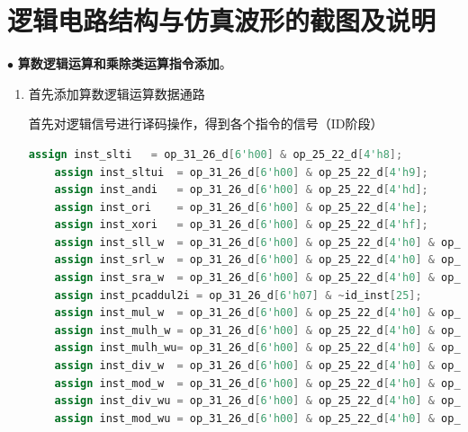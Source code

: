 \documentclass[11pt]{article}
\begin{document}


\section{逻辑电路结构与仿真波形的截图及说明}
\noindent
$\bullet$
\textbf{算数逻辑运算和乘除类运算指令添加}。
\begin{enumerate}
  \item 首先添加算数逻辑运算数据通路
  
  首先对逻辑信号进行译码操作，得到各个指令的信号（ID阶段）

  \begin{lstlisting}[language=verilog]
    assign inst_slti   = op_31_26_d[6'h00] & op_25_22_d[4'h8];
    assign inst_sltui  = op_31_26_d[6'h00] & op_25_22_d[4'h9];
    assign inst_andi   = op_31_26_d[6'h00] & op_25_22_d[4'hd];
    assign inst_ori    = op_31_26_d[6'h00] & op_25_22_d[4'he];
    assign inst_xori   = op_31_26_d[6'h00] & op_25_22_d[4'hf];
    assign inst_sll_w  = op_31_26_d[6'h00] & op_25_22_d[4'h0] & op_21_20_d[2'h1] & op_19_15_d[5'h0e];
    assign inst_srl_w  = op_31_26_d[6'h00] & op_25_22_d[4'h0] & op_21_20_d[2'h1] & op_19_15_d[5'h0f];
    assign inst_sra_w  = op_31_26_d[6'h00] & op_25_22_d[4'h0] & op_21_20_d[2'h1] & op_19_15_d[5'h10];
    assign inst_pcaddul2i = op_31_26_d[6'h07] & ~id_inst[25];
    assign inst_mul_w  = op_31_26_d[6'h00] & op_25_22_d[4'h0] & op_21_20_d[2'h1] & op_19_15_d[5'h18];
    assign inst_mulh_w = op_31_26_d[6'h00] & op_25_22_d[4'h0] & op_21_20_d[2'h1] & op_19_15_d[5'h19];
    assign inst_mulh_wu= op_31_26_d[6'h00] & op_25_22_d[4'h0] & op_21_20_d[2'h1] & op_19_15_d[5'h1a];
    assign inst_div_w  = op_31_26_d[6'h00] & op_25_22_d[4'h0] & op_21_20_d[2'h2] & op_19_15_d[5'h00];
    assign inst_mod_w  = op_31_26_d[6'h00] & op_25_22_d[4'h0] & op_21_20_d[2'h2] & op_19_15_d[5'h01];
    assign inst_div_wu = op_31_26_d[6'h00] & op_25_22_d[4'h0] & op_21_20_d[2'h2] & op_19_15_d[5'h02];
    assign inst_mod_wu = op_31_26_d[6'h00] & op_25_22_d[4'h0] & op_21_20_d[2'h2] & op_19_15_d[5'h03];
  \end{lstlisting}


\end{enumerate}
\end{document}
